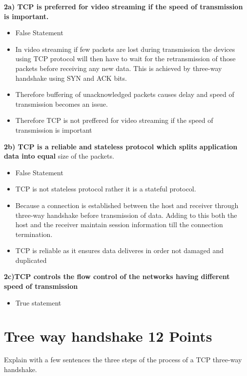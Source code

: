 \documentclass{resources/WeSTassignment}
\begin{document}
\textbf{2a) TCP is preferred for video streaming if the speed of transmission is important.}
			\begin{itemize}
			\item False Statement
			\item In video streaming if few packets are lost during transmission the devices using TCP protocol will then have to wait for the retransmission of those packets before receiving any new data. This is achieved by three-way handshake using SYN and ACK bits.
			\item Therefore buffering of unacknowledged packets causes delay and speed of transmission becomes an issue.
			\item Therefore TCP is not preffered for video streaming if the speed of transmission is important
			\end{itemize}
\textbf{2b) TCP is a reliable and stateless protocol which splits application data into equal}
size of the packets.
			\begin{itemize}
			\item False Statement
			\item TCP is not stateless protocol rather it is a stateful protocol.
			\item Because a connection is established between the host and receiver through three-way handshake before transmission of data. Adding to this both the host and the receiver maintain session information till the connection termination.
			\item TCP is reliable as it ensures data deliveres in order not damaged and duplicated 
			\end{itemize}
\textbf{2c)TCP controls the flow control of the networks having different speed of transmission} 
			\begin{itemize}
			\item True statement
			\end{itemize}




\section{Tree way handshake \hfill{12 Points}}
Explain with a few sentences the three steps of the process of a TCP three-way handshake.
\end{document}
